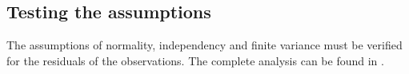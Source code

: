 \subsection{Testing the assumptions}\label{subsec:hdassumptions}

The assumptions of normality, independency and finite variance must be verified
for the residuals of the observations. The complete analysis can be found in
.




